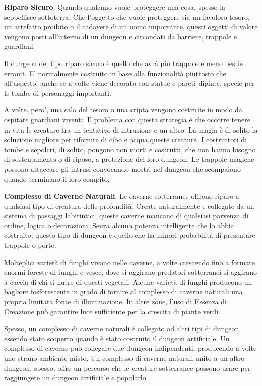 \documentclass[a4paper,11pt,twoside,openany]{book}
\begin{document}
\textbf{Riparo Sicuro}: Quando qualcuno vuole proteggere una cosa, spesso la seppellisce sottoterra. Che l'oggetto che vuole proteggere sia un favoloso tesoro, un artefatto proibito o il cadavere di un uomo importante, questi oggetti di valore vengono posti all'interno di un dungeon e circondati da barriere, trappole e guardiani.

Il dungeon del tipo riparo sicuro è quello che avrà più trappole e meno bestie erranti. E' normalmente costruito in base alla funzionalità piuttosto che all'aspetto, anche se a volte viene decorato con statue e pareti dipinte, specie per le tombe di personaggi importanti.

A volte, pero', una sala del tesoro o una cripta vengono costruite in modo da ospitare guardiani viventi. Il problema con questa strategia è che occorre tenere in vita le creature tra un tentativo di intrusione e un altro. La magia è di solito la soluzione migliore per rifornire di cibo e acqua queste creature. I costruttori di tombe e sepolcri, di solito, pongono non morti e costrutti, che non hanno bisogno di sostentamento o di riposo, a protezione dei loro dungeon. Le trappole magiche possono attaccare gli intrusi convocando mostri nel dungeon che scompaiono quando terminano il loro compito.

\textbf{Complesso di Caverne Naturali}: Le caverne sotterranee offrono riparo a qualsiasi tipo di creatura delle profondità. Create naturalmente e collegate da un sistema di passaggi labirintici, queste caverne mancano di qualsiasi parvenza di ordine, logica o decorazioni. Senza alcuna potenza intelligente che lo abbia costruito, questo tipo di dungeon è quello che ha minori probabilità di presentare trappole o porte.

Molteplici varietà di funghi vivono nelle caverne, a volte crescendo fino a formare enormi foreste di funghi e vesce, dove si aggirano predatori sotterranei si aggirano a caccia di chi si nutre di questi vegetali. Alcune varietà di funghi producono un bagliore fosforescente in grado di fornire al complesso di caverne naturali una propria limitata fonte di illuminazione. In altre zone, l'uso di Essenza di Creazione può garantire luce sufficiente per la crescita di piante verdi.

Spesso, un complesso di caverne naturali è collegato ad altri tipi di dungeon, essendo stato scoperto quando è stato costruito il dungeon artificiale. Un complesso di caverne può collegare due dungeon indipendenti, producendo a volte uno strano ambiente misto. Un complesso di caverne naturali unito a un altro dungeon, spesso, offre un percorso che le creature sotterranee possono usare per raggiungere un dungeon artificiale e popolarlo.
\end{document}
